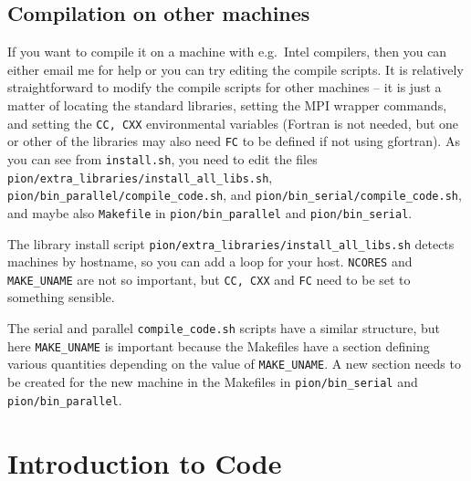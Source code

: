 \documentclass[a4paper,11pt]{report}
\begin{document}
\subsection{Compilation on other machines}
If you want to compile it on a machine with e.g.\ Intel compilers, then you can either email me for help or you can try editing the compile scripts.
It is relatively straightforward to modify the compile scripts for other machines -- it is just a matter of locating the standard libraries, setting the MPI wrapper commands, and setting the \texttt{CC, CXX} environmental variables (Fortran is not needed, but one or other of the libraries may also need \texttt{FC} to be defined if not using gfortran).
As you can see from \verb|install.sh|, you need to edit the files
\verb|pion/extra_libraries/install_all_libs.sh|,
\verb|pion/bin_parallel/compile_code.sh|, and
\verb|pion/bin_serial/compile_code.sh|, and maybe also \verb|Makefile| in
\verb|pion/bin_parallel| and \verb|pion/bin_serial|.

The library install script \verb|pion/extra_libraries/install_all_libs.sh| detects machines by hostname, so you can add a loop for your host.
\texttt{NCORES} and \texttt{MAKE\_UNAME} are not so important, but \texttt{CC, CXX} and \texttt{FC} need to be set to something sensible.

The serial and parallel \verb|compile_code.sh| scripts have a similar structure, but here \texttt{MAKE\_UNAME} is important because the Makefiles have a section defining various quantities depending on the value of \texttt{MAKE\_UNAME}.
A new section needs to be created for the new machine in the Makefiles in \verb|pion/bin_serial| and \verb|pion/bin_parallel|.



 




\section{Introduction to Code}
%
\end{document}
